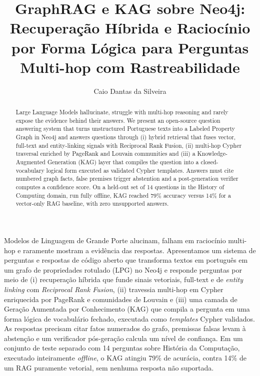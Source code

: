 \documentclass[12pt]{article}
\title{GraphRAG e KAG sobre Neo4j: Recuperação Híbrida e Raciocínio por Forma Lógica para Perguntas Multi-hop com Rastreabilidade}
\author{Caio Dantas da Silveira\inst{1}}
\begin{document}
\maketitle

\begin{abstract}
Large Language Models hallucinate, struggle with multi-hop reasoning and rarely expose the evidence behind their answers. We present an open-source question answering system that turns unstructured Portuguese texts into a Labeled Property Graph in Neo4j and answers questions through (i) hybrid retrieval that fuses vector, full-text and entity-linking signals with Reciprocal Rank Fusion, (ii) multi-hop Cypher traversal enriched by PageRank and Louvain communities and (iii) a Knowledge-Augmented Generation (KAG) layer that compiles the question into a closed-vocabulary logical form executed as validated Cypher templates. Answers must cite numbered graph facts, false premises trigger abstention and a post-generation verifier computes a confidence score. On a held-out set of 14 questions in the History of Computing domain, run fully offline, KAG reached 79\% accuracy versus 14\% for a vector-only RAG baseline, with zero unsupported answers.
\end{abstract}

\begin{resumo}
Modelos de Linguagem de Grande Porte alucinam, falham em raciocínio multi-hop e raramente mostram a evidência das respostas. Apresentamos um sistema de perguntas e respostas de código aberto que transforma textos em português em um grafo de propriedades rotulado (LPG) no Neo4j e responde perguntas por meio de (i) recuperação híbrida que funde sinais vetoriais, full-text e de \textit{entity linking} com \textit{Reciprocal Rank Fusion}, (ii) travessia multi-hop em Cypher enriquecida por PageRank e comunidades de Louvain e (iii) uma camada de Geração Aumentada por Conhecimento (KAG) que compila a pergunta em uma forma lógica de vocabulário fechado, executada como \textit{templates} Cypher validados. As respostas precisam citar fatos numerados do grafo, premissas falsas levam à abstenção e um verificador pós-geração calcula um nível de confiança. Em um conjunto de teste separado com 14 perguntas sobre História da Computação, executado inteiramente \textit{offline}, o KAG atingiu 79\% de acurácia, contra 14\% de um RAG puramente vetorial, sem nenhuma resposta não suportada.
\end{resumo}

\end{document}
